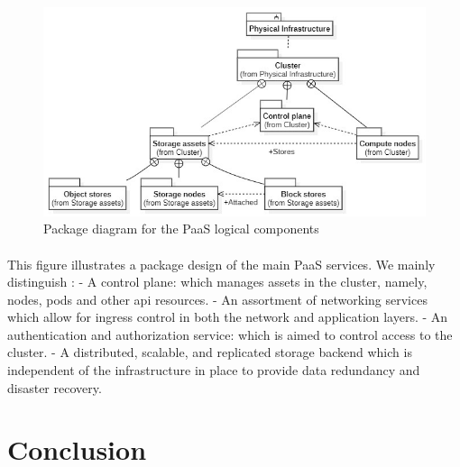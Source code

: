 \begin{figure}[H]\centering
\includegraphics[width=1.0\textwidth,angle=00]{assets/f11.jpg}
\caption{Package diagram for the PaaS logical components}
\label{fig:f11}
\end{figure}


\paragraph{}This figure illustrates a package design of the main PaaS services. We mainly distinguish :\newline
-	A control plane: which manages assets in the cluster, namely, nodes, pods and other api resources. \newline
-	An assortment of networking services which allow for ingress control in both the network and application layers.\newline
-	An authentication and authorization service: which is aimed to control access to the cluster.\newline
-	A distributed, scalable, and replicated storage backend which is independent of the infrastructure in place to provide data redundancy and disaster recovery.

\section*{Conclusion}
